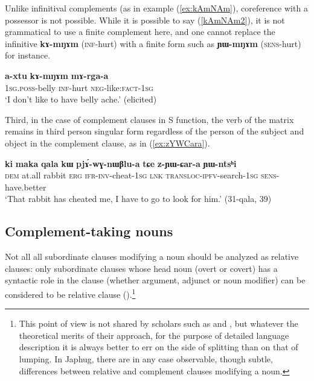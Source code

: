 \documentclass[oneside,a4paper,11pt]{article}
\newcommand{\ipa}[1]{\textbf{\phon#1}} %
\begin{document}
Unlike infinitival complements (as in example (\ref{ex:kAmNAm}), coreference with a possessor is not possible. While it is possible to say (\ref{kAmNAm2}), it is not grammatical to use a finite complement here, and one cannot replace the infinitive \ipa{kɤ-mŋɤm} (\textsc{inf}-hurt) with a finite form such as \ipa{ɲɯ-mŋɤm} (\textsc{sens}-hurt) for instance.

\begin{exe}
\ex \label{kAmNAm2}
\gll \ipa{a-xtu} \ipa{kɤ-mŋɤm} \ipa{mɤ-rga-a} \\
\textsc{1sg.poss}-belly \textsc{inf}-hurt \textsc{neg}-like:\textsc{fact-1sg} \\
\glt `I don't like to have belly ache.' (elicited)
\end{exe}

Third, in the case of complement clauses in S function, the verb of the matrix remains in third person singular form regardless of the person of the subject and object in the complement clause, as in (\ref{ex:zYWCara}).

\begin{exe}
\ex \label{ex:zYWCara}
\gll \ipa{ki} 	\ipa{maka} 	\ipa{qala} 	\ipa{kɯ} 	\ipa{pjɤ́-wɣ-nɯβlu-a} 	\ipa{tɕe} 	\ipa{z-ɲɯ-ɕar-a} 	\ipa{ɲɯ-ntsʰi}\\ 
\textsc{dem} at.all rabbit \textsc{erg} \textsc{ifr-inv}-cheat-\textsc{1sg} \textsc{lnk} \textsc{transloc-ipfv}-search-\textsc{1sg} \textsc{sens}-have.better \\
\glt `That rabbit has cheated me, I have to go to look for him.' (31-qala, 39)
\end{exe}

\subsection{Complement-taking nouns} \label{sec:comp.noun}
 Not all all subordinate clauses modifying a noun should be analyzed as relative clauses: only subordinate clauses whose head noun (overt or covert) has a syntactic role in the clause (whether argument, adjunct or noun modifier) can be considered to be relative clause (\citealt{jackson06guanxiju, jacques16relatives}).\footnote{This point of view is not shared by scholars such as \citet{matsumoto88adnominal} and \citet{comrie98relatives.rethinking}, but whatever the theoretical merits of their approach, for the purpose of detailed language description it is always better to err on the side of splitting than on that of lumping.  In Japhug, there are in any case observable, though subtle, differences between relative and complement clauses modifying a noun.}
\end{document}
